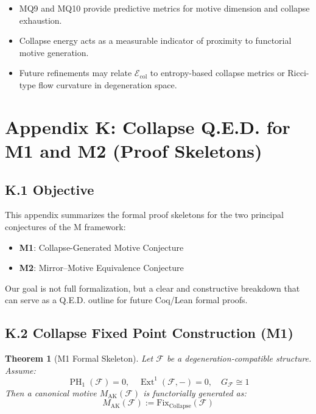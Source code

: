 \documentclass[11pt]{article}
\newtheorem{theorem}{Theorem}[section]
\DeclareMathOperator{\Ext}{Ext}
\DeclareMathOperator{\PH}{PH}
\begin{document}
\begin{itemize}
  \item MQ9 and MQ10 provide predictive metrics for motive dimension and collapse exhaustion.
  \item Collapse energy acts as a measurable indicator of proximity to functorial motive generation.
  \item Future refinements may relate $\mathcal{E}_{\mathrm{col}}$ to entropy-based collapse metrics or Ricci-type flow curvature in degeneration space.
\end{itemize}

\FloatBarrier




\section*{Appendix K: Collapse Q.E.D. for M1 and M2 (Proof Skeletons)}

\subsection*{K.1 Objective}

This appendix summarizes the formal proof skeletons for the two principal conjectures of the M framework:
\begin{itemize}
  \item \textbf{M1}: Collapse-Generated Motive Conjecture
  \item \textbf{M2}: Mirror–Motive Equivalence Conjecture
\end{itemize}

Our goal is not full formalization, but a clear and constructive breakdown that can serve as a Q.E.D. outline for future Coq/Lean formal proofs.

\subsection*{K.2 Collapse Fixed Point Construction (M1)}

\begin{theorem}[M1 Formal Skeleton]
Let $\mathcal{F}$ be a degeneration-compatible structure. Assume:
\[
\PH_1(\mathcal{F}) = 0, \quad \Ext^1(\mathcal{F}, -) = 0, \quad G_{\mathcal{F}} \cong 1
\]
Then a canonical motive $M_{\mathrm{AK}}(\mathcal{F})$ is functorially generated as:
\[
M_{\mathrm{AK}}(\mathcal{F}) := \mathrm{Fix}_{\mathrm{Collapse}}(\mathcal{F})
\]
\end{theorem}
\end{document}
